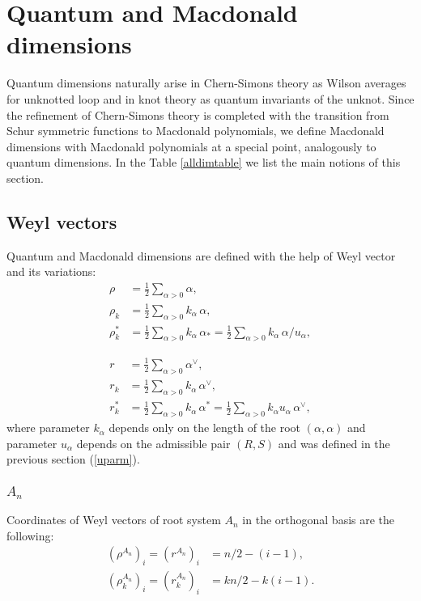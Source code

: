 \documentclass{article}
\begin{document}
\section{Quantum and Macdonald dimensions \label{DimsSec}}
Quantum dimensions naturally arise in Chern-Simons theory as Wilson averages for unknotted loop and in knot theory as quantum invariants of the unknot.  Since the refinement of Chern-Simons theory is completed with the transition from Schur symmetric functions to Macdonald polynomials, we define Macdonald dimensions with Macdonald polynomials at a special point, analogously to quantum dimensions. In the Table \ref{alldimtable} we list the main notions of this section.


\subsection{Weyl vectors}
Quantum and Macdonald dimensions are defined with the help of Weyl vector and its variations:
\begin{align}
     \rho & = \frac{1}{2} \sum_{\alpha > 0} \alpha, \label{rho}\\
     \rho_k & = \frac{1}{2} \sum_{\alpha > 0} k_{\alpha} \, \alpha, \label{rhok} \\
     \rho_k^{*} & = \frac{1}{2} \sum_{\alpha > 0} k_{\alpha} \, \alpha_{*} = \frac{1}{2} \sum_{\alpha > 0} k_{\alpha} \, \alpha/u_{\alpha}, \label{rhostar}
\end{align}

\begin{align}
    r & = \frac{1}{2} \sum_{\alpha > 0} \alpha^{\vee}, \label{r}\\
    r_k & = \frac{1}{2} \sum_{\alpha > 0} k_{\alpha} \, \alpha^{\vee}, \label{rk} \\
    r_k^{*} & = \frac{1}{2} \sum_{\alpha > 0} k_{\alpha} \, \alpha^{*} = \frac{1}{2} \sum_{\alpha > 0} k_{\alpha} u_{\alpha}\, \alpha^{\vee}, \label{rstar}
\end{align}
where parameter $k_{\alpha}$ depends only on the length of the root $(\alpha,\alpha)$ and parameter $u_{\alpha}$ depends on the admissible pair $(R,S)$ and was defined in the previous section (\ref{uparm}).

\subsubsection{$A_n$}
Coordinates of Weyl vectors of root system $A_n$ in the orthogonal basis are the following:
\begin{equation}
    \begin{aligned}
        \left (\rho^{A_n} \right)_i=\left (r^{A_n} \right)_i &=n/2-(i-1), \\
        \left (\rho^{A_n}_k \right)_i= \left (r^{A_n}_k \right)_i & = kn/2-k(i-1). \\
    \end{aligned}
\end{equation}
\end{document}
